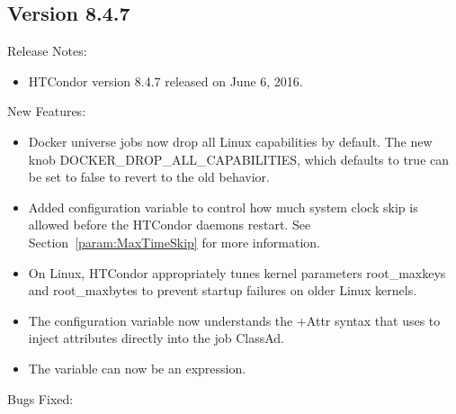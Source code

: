\subsection*{\label{sec:New-8-4-7}Version 8.4.7}

\noindent Release Notes:

\begin{itemize}

\item HTCondor version 8.4.7 released on June 6, 2016.

\end{itemize}


\noindent New Features:

\begin{itemize}

\item Docker universe jobs now drop all Linux capabilities by default.
The new knob DOCKER\_DROP\_ALL\_CAPABILITIES, which defaults to true
can be set to false to revert to the old behavior.

\item Added configuration variable  to control 
	how much system clock skip is allowed before the HTCondor daemons
	restart.  See Section~\ref{param:MaxTimeSkip} for more information.

\item On Linux, HTCondor appropriately tunes kernel parameters
root\_maxkeys and root\_maxbytes to prevent  
startup failures on older Linux kernels.

\item The configuration variable  now understands the +Attr
syntax that  uses to inject attributes directly into the job ClassAd.

\item The  variable  can now be an
expression.

\end{itemize}

\noindent Bugs Fixed:

